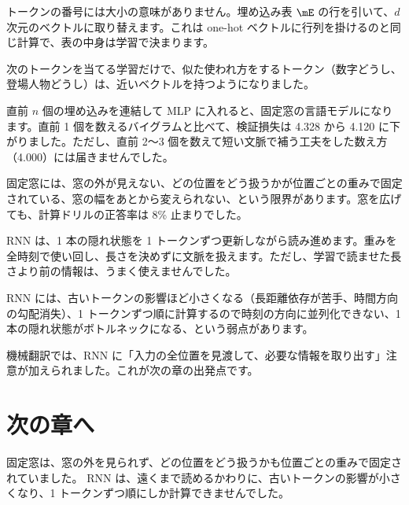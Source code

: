 \begin{summary}
\item トークンの番号には大小の意味がありません。埋め込み表 $\mE$ の行を引いて、$d$ 次元のベクトルに取り替えます。これは one-hot ベクトルに行列を掛けるのと同じ計算で、表の中身は学習で決まります。
\item 次のトークンを当てる学習だけで、似た使われ方をするトークン（数字どうし、登場人物どうし）は、近いベクトルを持つようになりました。
\item 直前 $n$ 個の埋め込みを連結して MLP に入れると、固定窓の言語モデルになります。直前 1 個を数えるバイグラムと比べて、検証損失は 4.328 から 4.120 に下がりました。ただし、直前 2〜3 個を数えて短い文脈で補う工夫をした数え方（4.000）には届きませんでした。
\item 固定窓には、窓の外が見えない、どの位置をどう扱うかが位置ごとの重みで固定されている、窓の幅をあとから変えられない、という限界があります。窓を広げても、計算ドリルの正答率は 8\% 止まりでした。
\item RNN は、1 本の隠れ状態を 1 トークンずつ更新しながら読み進めます。重みを全時刻で使い回し、長さを決めずに文脈を扱えます。ただし、学習で読ませた長さより前の情報は、うまく使えませんでした。
\item RNN には、古いトークンの影響ほど小さくなる（長距離依存が苦手、時間方向の勾配消失）、1 トークンずつ順に計算するので時刻の方向に並列化できない、1 本の隠れ状態がボトルネックになる、という弱点があります。
\item 機械翻訳では、RNN に「入力の全位置を見渡して、必要な情報を取り出す」注意が加えられました。これが次の章の出発点です。
\end{summary}

\section*{次の章へ}

固定窓は、窓の外を見られず、どの位置をどう扱うかも位置ごとの重みで固定されていました。
RNN は、遠くまで読めるかわりに、古いトークンの影響が小さくなり、1 トークンずつ順にしか計算できませんでした。

